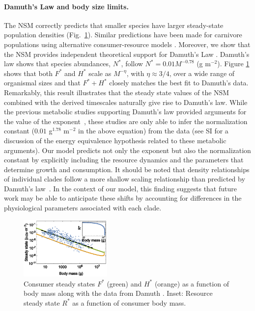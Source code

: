 \documentclass[twocolumn,preprintnumbers,amsmath,amssymb,superscriptaddress]{revtex4}
\begin{document}
\noindent \paragraph*{{\bf Damuth's Law and body size limits.}} The NSM
correctly predicts that smaller species have larger steady-state population
densities (Fig.~\ref{fig:mass}).  Similar predictions have been made for
carnivore populations using alternative consumer-resource models
\citep{DeLong:2012kw}.  Moreover, we show that the NSM provides independent
theoretical support for Damuth's Law
\citep{Damuth:1987kr,allen2002,enquist1998,Pedersen:2017he}.  Damuth's
law shows that species abundances, $N^{*}$, follow $N^*=0.01
M^{-0.78}$ (g m$^{-2}$). Figure \ref{fig:mass} shows that both $F^{*}$ and $H^{*}$ scale
as $M^{-\eta}$, with $\eta\approx 3/4$,  over a wide range of organismal sizes and that $F^{*}+H^{*}$
closely matches the best fit to Damuth's data.  Remarkably, this result
illustrates that the steady state values of the NSM combined with the derived
timescales naturally give rise to Damuth's law. While the previous metabolic
studies supporting Damuth's law provided arguments for the value of the
exponent~\citep{allen2002}, these studies are only able to infer the
normalization constant ($0.01$ g$^{1.78}$ m$^{-2}$ in the above equation) from the data (see SI for a discussion of the energy
equivalence hypothesis related to these metabolic arguments). Our model
predicts not only the exponent but also the normalization constant by
explicitly including the resource dynamics and the parameters that determine
growth and consumption. It should be noted that density relationships of
individual clades follow a more shallow scaling relationship than predicted
by Damuth's law~\cite{Pedersen:2017he}.  In the context of our model,
this finding suggests that future work may be able to anticipate these shifts
by accounting for differences in the physiological parameters associated with
each clade.


\begin{figure}
\centering
\includegraphics[width=0.4\textwidth]{fig_FPAllometric2.eps}
\caption{\small{Consumer steady states $F^*$ (green) and $H^*$ (orange) as a function of
  body mass along with the data from Damuth \citep{Damuth:1987kr}. Inset: Resource steady state $R^*$ as a function of consumer body mass.}\label{fig:mass}}
\end{figure}
\end{document}
